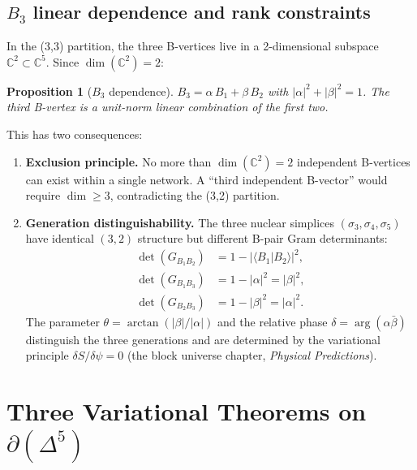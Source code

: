 \documentclass[12pt]{article}
\newtheorem{proposition}[theorem]{Proposition}
\theoremstyle{remark}
\theoremstyle{definition}
\newcommand{\CC}{\mathbb{C}}
\begin{document}
\subsection{$B_3$ linear dependence and rank constraints}
\label{sec:B3_dependence}

In the (3,3) partition, the three B-vertices live in a 2-dimensional subspace $\CC^2 \subset \CC^5$.  Since $\dim(\CC^2) = 2$:

\begin{proposition}[$B_3$ dependence]
\label{prop:B3}
$B_3 = \alpha\, B_1 + \beta\, B_2$ with $|\alpha|^2 + |\beta|^2 = 1$.  The third B-vertex is a unit-norm linear combination of the first two.
\end{proposition}

This has two consequences:
\begin{enumerate}
\item \textbf{Exclusion principle.}  No more than $\dim(\CC^2) = 2$ independent B-vertices can exist within a single network.  A ``third independent B-vector'' would require $\dim \geq 3$, contradicting the (3,2) partition.

\item \textbf{Generation distinguishability.}  The three nuclear simplices $(\sigma_3, \sigma_4, \sigma_5)$ have identical $(3,2)$ structure but different B-pair Gram determinants:
\begin{align}
\det(G_{B_1 B_2}) &= 1 - |\langle B_1 | B_2 \rangle|^2, \\
\det(G_{B_1 B_3}) &= 1 - |\alpha|^2 = |\beta|^2, \\
\det(G_{B_2 B_3}) &= 1 - |\beta|^2 = |\alpha|^2.
\end{align}
The parameter $\theta = \arctan(|\beta|/|\alpha|)$ and the relative phase $\delta = \arg(\alpha\bar\beta)$ distinguish the three generations and are determined by the variational principle $\delta S / \delta\psi = 0$ (the block universe chapter, \textit{Physical Predictions}).
\end{enumerate}

\section{Three Variational Theorems on $\partial(\Delta^5)$}
\label{ch:variational_theorems}
\end{document}

